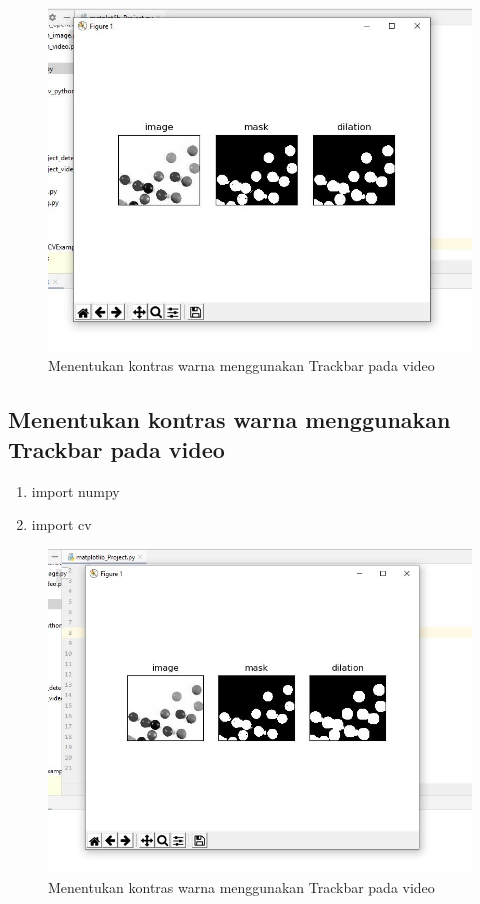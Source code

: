 \newpage
\begin{figure}[ht]
\centering
\includegraphics[scale=0.5]{figures/2,52.jpg}
\caption{Menentukan kontras warna menggunakan Trackbar pada video}
\label{contoh}
\end{figure}







\newpage
\subsection{Menentukan kontras warna menggunakan Trackbar pada video}

\begin{enumerate}
	\item import numpy
	\item import cv
\end{enumerate}

\newpage
\begin{figure}[ht]
\centering
\includegraphics[scale=0.5]{figures/2,53.jpg}
\caption{Menentukan kontras warna menggunakan Trackbar pada video}
\label{contoh}
\end{figure}







